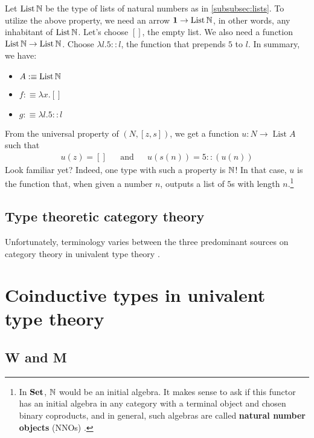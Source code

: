 \documentclass[12pt,twoside,draft]{reedthesis}
\begin{document}
\begin{example}
  Let $\operatorname{List}\mathbb{N}$ be the type of lists of natural numbers
  as in \cref{subsubsec:lists}. To utilize the above property, we need
  an arrow $\textbf{1}\to \operatorname{List}\mathbb{N}$, in other words, any inhabitant
  of $\operatorname{List}\mathbb{N}$. Let's choose $[]$, the empty list.
  We also need a function $\operatorname{List}\mathbb{N}\to \operatorname{List}\mathbb{N}$.
  Choose $\lambda l.5::l$, the function that prepends $5$ to $l$. In summary, we
  have:
  \begin{itemize}
    \itemsep0em
    \item $A:\equiv \operatorname{List}\mathbb{N}$
    \item $f:\equiv \lambda x.[]$
    \item $g:\equiv \lambda l.5::l$
  \end{itemize}
  From the universal property of $(N,[z,s])$, we get a function
  $u:N\to \operatorname{List} A$ such that
  \begin{align*}
    u(z) = []
    &&\text{and}&&
    u(s(n)) = 5::(u(n))
  \end{align*}
  Look familiar yet? Indeed, one type with such a property is $\mathbb{N}$! In that
  case, $u$ is the function that, when given a number $n$, outputs a list of $5$s
  with length $n$.\footnote{In $\operatorname{\mathbf{Set}}$, $\mathbb{N}$ would be an initial algebra.
    It makes sense to ask if this functor has an initial algebra in any
    category with a terminal object and chosen binary coproducts, and in
    general, such algebras are called \textbf{natural number objects} (NNOs) 
    \cite{sketches}.
  }
\end{example}

\section{Type theoretic category theory}
\label{sec:type-theoretic-category-theory}

Unfortunately, terminology varies between the three predominant sources
on category theory in univalent type theory \cite{book} \cite{unimath}
\cite{hott-lib}. 

\chapter{Coinductive types in univalent type theory}
\label{chap:coinductive-types-in-univalent-type-theory}

\section{W and M}
\label{sec:w-and-m}
\end{document}
